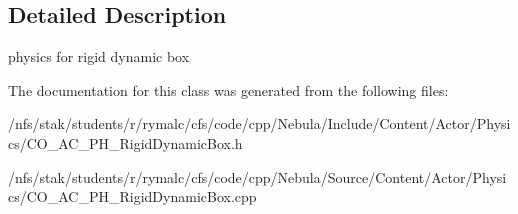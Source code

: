 \subsection{Detailed Description}
physics for rigid dynamic box 

The documentation for this class was generated from the following files:\begin{DoxyCompactItemize}
\item 
/nfs/stak/students/r/rymalc/cfs/code/cpp/Nebula/Include/Content/Actor/Physics/CO\_\-AC\_\-PH\_\-RigidDynamicBox.h\item 
/nfs/stak/students/r/rymalc/cfs/code/cpp/Nebula/Source/Content/Actor/Physics/CO\_\-AC\_\-PH\_\-RigidDynamicBox.cpp\end{DoxyCompactItemize}
